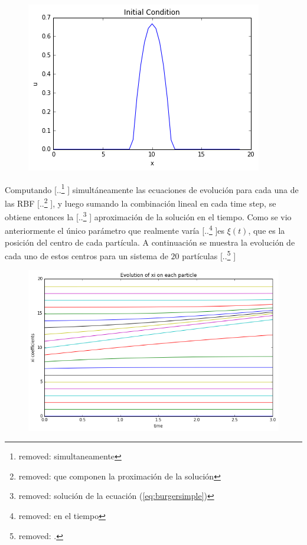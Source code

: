 \documentclass[spanish]{article} %
\providecommand{\DIFaddtex}[1]{{\protect\color{blue} \sf #1}} %
\providecommand{\DIFdeltex}[1]{{\protect\color{red} [..\footnote{removed: #1} ]}} %
\providecommand{\DIFaddbegin}{} %
\providecommand{\DIFaddend}{} %
\providecommand{\DIFdelbegin}{} %
\providecommand{\DIFdelend}{} %
\providecommand{\DIFaddbeginFL}{} %
\providecommand{\DIFaddendFL}{} %
\providecommand{\DIFdelbeginFL}{} %
\providecommand{\DIFdelendFL}{} %
\providecommand{\DIFadd}[1]{\texorpdfstring{\DIFaddtex{#1}}{#1}} %
\providecommand{\DIFdel}[1]{\texorpdfstring{\DIFdeltex{#1}}{}} %
\begin{document}
    \begin{figure}[H]
        \centering
        \DIFaddendFL \includegraphics[scale=0.6]{initialu.png}
    \DIFdelbeginFL %
\DIFdelendFL \DIFaddbeginFL \end{figure}
    \DIFaddend 


    Computando \DIFdelbegin \DIFdel{simultaneamente }\DIFdelend \DIFaddbegin \DIFadd{simultáneamente }\DIFaddend las ecuaciones de evolución para cada una de las RBF\DIFdelbegin \DIFdel{que componen la proximación de la solución}\DIFdelend , y luego sumando la combinación lineal en cada time step, se obtiene entonces la \DIFdelbegin \DIFdel{solución de la ecuación (\ref{eq:burgersimple}) }\DIFdelend \DIFaddbegin \DIFadd{aproximación de la solución }\DIFaddend en el tiempo. Como se vio anteriormente el único parámetro que \DIFaddbegin \DIFadd{realmente }\DIFaddend varía \DIFdelbegin \DIFdel{en el tiempo }\DIFdelend es $\xi(t)$, que es la posición del centro de cada partícula. A continuación se muestra la evolución de cada uno de estos centros para un sistema de $20$ partículas
    \DIFdelbegin \DIFdel{.
    }%
\DIFdelendFL \DIFaddbeginFL \begin{figure}[H]
      \DIFaddendFL \centering
      \includegraphics[scale=0.5]{xis.png}
    \end{figure}
\end{document}
